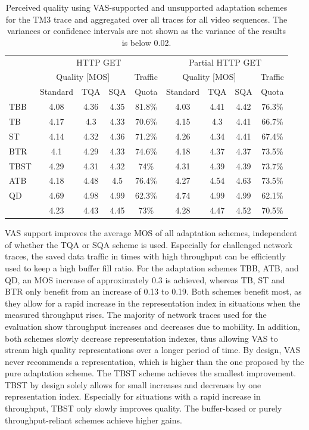\begin{table}[htb]
 \centering
 \caption[Perceived quality using the VAS adaptation scheme]{Perceived quality using VAS-supported and unsupported adaptation schemes for the TM3 trace and aggregated over all traces for all video sequences. The variances or confidence intervals are not shown as the variance of the results is below 0.02.} 
 \begin{tabular}{l|cccc|cccc}
  \toprule[2.0pt]
  & \multicolumn{4}{c}{HTTP GET}
    & \multicolumn{4}{c}{Partial HTTP GET} \\
  & \multicolumn{3}{c}{Quality [MOS]}
  & Traffic& \multicolumn{3}{c}{Quality [MOS]} & Traffic \\
  
 & Standard & TQA & SQA & Quota & Standard & TQA & SQA  & Quota\\
  \hline
  TBB & 4.08 &4.36 & 4.35 & 81.8\% & 4.03 & 4.41 & 4.42 & 76.3\% \\
  TB & 4.17 & 4.3 & 4.33 & 70.6\% & 4.15 & 4.3 & 4.41 & 66.7\% \\
  ST & 4.14 & 4.32&  4.36 & 71.2\% & 4.26 & 4.34 & 4.41 & 67.4\% \\
  BTR & 4.1 & 4.29 & 4.33 & 74.6\% & 4.18 & 4.37 & 4.37 & 73.5\% \\
  TBST & 4.29 & 4.31& 4.32 &  74\% & 4.31& 4.39 &4.39 & 73.7\% \\
  ATB & 4.18 & 4.48& 4.5 & 76.4\% & 4.27 & 4.54 & 4.63 & 73.5\% \\
  QD & 4.69 & 4.98& 4.99 &  62.3\% & 4.74 & 4.99 & 4.99 & 62.1\% \\
  \hline
   & 4.23 & 4.43& 4.45 & 73\% & 4.28 & 4.47 & 4.52 & 70.5\%\\
  \hline
  \bottomrule[2.0pt]
 \end{tabular}
 \label{tab:730_qualityPreffedAdaptLogicByAL}
\end{table}

\ac{VAS} support improves the average \ac{MOS} of all adaptation schemes, independent of whether the \ac{TQA} or \ac{SQA} scheme is used.
Especially for challenged network traces, the saved data traffic in times with high throughput can be efficiently used to keep a high buffer fill ratio.
For the adaptation schemes \ac{TBB}, \ac{ATB}, and \ac{QD}, an \ac{MOS} increase of approximately 0.3 is achieved, whereas \ac{TB}, \ac{ST} and \ac{BTR} only benefit from an increase of 0.13 to 0.19.
Both schemes benefit most, as they allow for a rapid increase in the representation index in situations when the measured throughput rises.
The majority of network traces used for the evaluation show throughput increases and decreases due to mobility.
In addition, both schemes slowly decrease representation indexes, thus allowing \ac{VAS} to stream high quality representations over a longer period of time.
By design, \ac{VAS} never recommends a representation, which is higher than the one proposed by the pure adaptation scheme.
The \ac{TBST} scheme achieves the smallest improvement.  
\ac{TBST} by design solely allows for small increases and decreases by one representation index.
Especially for situations with a rapid increase in throughput, \ac{TBST} only slowly improves quality. 
The buffer-based or purely throughput-reliant schemes achieve higher gains.

